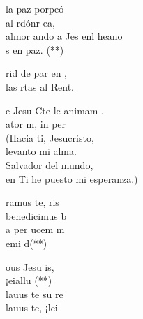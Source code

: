 \documentclass[12pt]{article}
\begin{document}
\begin{multicols*}{2}
\begin{cancion}%
	la paz porpeó\\
	al rdónr ea,\\
	almor ando a Jes enl heano\\
	s en paz. (**)\\
\end{cancion}%

\begin{cancion}%
	rid de par en ,\\
	las rtas al Rent.\\
\end{cancion}%

\begin{cancion}%
	e Jesu Cte le animam .\\
	ator m, in per\\
(Hacia ti, Jesucristo, \\
 levanto mi alma.\\
 Salvador del mundo, \\
 en Ti he puesto mi esperanza.)\\
\end{cancion}%

\begin{cancion}%
	ramus te, ris\\
	benedicimus b\\
	a per ucem m\\
	emi d(**)\\
\end{cancion}%

\begin{cancion}%
	ous Jesu is,\\
	¡eiallu (**)\\
	lauus te su re\\
	 lauus te, ¡lei \\
\end{cancion}%


\end{multicols*}
\end{document}
